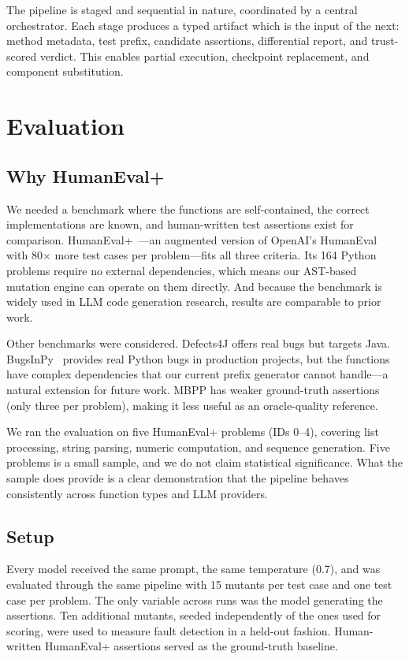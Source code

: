 \documentclass[conference]{IEEEtran}
\begin{document}
The pipeline is staged and sequential in nature, coordinated by a central orchestrator. Each stage produces a typed artifact which is the input of the next: method metadata, test prefix, candidate assertions, differential report, and trust-scored verdict. This enables partial execution, checkpoint replacement, and component substitution.

\section{Evaluation}

\subsection{Why HumanEval+}

We needed a benchmark where the functions are self-contained, the correct implementations are known, and human-written test assertions exist for comparison. HumanEval+~\cite{liu2024evalplus}---an augmented version of OpenAI's HumanEval~\cite{chen2021humaneval} with 80$\times$ more test cases per problem---fits all three criteria. Its 164 Python problems require no external dependencies, which means our AST-based mutation engine can operate on them directly. And because the benchmark is widely used in LLM code generation research, results are comparable to prior work.

Other benchmarks were considered. Defects4J offers real bugs but targets Java. BugsInPy~\cite{widyasari2020bugsinpy} provides real Python bugs in production projects, but the functions have complex dependencies that our current prefix generator cannot handle---a natural extension for future work. MBPP has weaker ground-truth assertions (only three per problem), making it less useful as an oracle-quality reference.

We ran the evaluation on five HumanEval+ problems (IDs 0--4), covering list processing, string parsing, numeric computation, and sequence generation. Five problems is a small sample, and we do not claim statistical significance. What the sample does provide is a clear demonstration that the pipeline behaves consistently across function types and LLM providers.

\subsection{Setup}

Every model received the same prompt, the same temperature (0.7), and was evaluated through the same pipeline with 15 mutants per test case and one test case per problem. The only variable across runs was the model generating the assertions. Ten additional mutants, seeded independently of the ones used for scoring, were used to measure fault detection in a held-out fashion. Human-written HumanEval+ assertions served as the ground-truth baseline.
\end{document}
